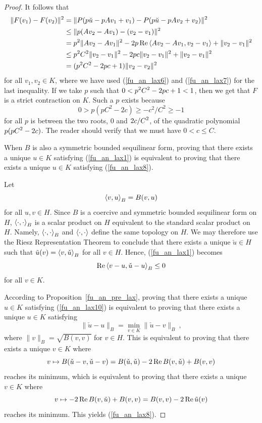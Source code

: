 \begin{proof}
It follows that
\begin{align*}
\| F(v_1) - F(v_2) \|^2 &= \| P(p\breve{u}-p Av_1 +v_1) -
P(p\breve{u}-p Av_2 +v_2) \|^2 \\
& \leq \| p (Av_2 - Av_1) - (v_2 - v_1) \|^2 \\
&= p^2 \| Av_2 - Av_1\|^2 -2p \operatorname{Re}\left\langle{Av_2 - Av_1} , {v_2 - v_1}\right\rangle
+ \|v_2 - v_1\|^2 \\
&\leq p^2 C^2 \| v_2-v_1 \|^2 - 2pc \|v_2-v_1\|^2 + \|v_2-v_1\|^2 \\
& = (p^2 C^2 - 2pc +1 ) \|v_2-v_2\|^2
\end{align*}
for all $v_1, v_2 \in K$, where we have used
(\ref{fu_an_lax6}) and (\ref{fu_an_lax7}) for the last
inequality.  If we take $p$ such that
$\displaystyle 0< p^2 C^2 - 2pc +1 <1$, then we
get that $F$ is a strict contraction on $K$.  Such a $p$ exists
because
\[
0 > p(pC^2 -2c) \geq -c^2/C^2 \geq -1
\]
for all $p$ is between the two roots, $0$ and $\displaystyle 2c/C^2$, of the
quadratic polynomial $\displaystyle p(pC^2 -2c)$.  The reader should verify
that we must have $0<c\leq C$.

 When $B$ is also a symmetric bounded sequilinear form,
proving that there exists a unique $u\in K$ satisfying
(\ref{fu_an_lax1}) is equivalent to proving that there exists a unique
$u\in K$ satisfying (\ref{fu_an_lax8}).

Let
\[
\left\langle{v} , {u}\right\rangle_B = B(v,u) 
\]
for all $u,v \in H$.  Since $B$ is a coercive and symmetric bounded
sequilinear form on $H$, $\left\langle{\cdot} , {\cdot}\right\rangle_B$ is a scalar product on
$H$ equivalent to the standard scalar product on $H$.  Namely,
$\left\langle{\cdot} , {\cdot}\right\rangle_B$ and $\left\langle{\cdot} , {\cdot}\right\rangle$ define the same topology
on $H$.
We may therefore use the Riesz Representation Theorem to conclude
that there exists a unique $\check{u} \in H$ such that
$\displaystyle \tilde{u}(v) = \left\langle{v} , {\check{u}}\right\rangle_B$ for all $v \in H$.
Hence, (\ref{fu_an_lax1}) becomes
\begin{equation} \label{fu_an_lax10}
\operatorname{Re} \left\langle{v-u} , {\check{u}-u}\right\rangle_B \leq 0
\end{equation}
for all $v \in K$.

According to Proposition~\ref{fu_an_pre_lax}, proving that there exists
a unique $u\in K$ satisfying (\ref{fu_an_lax10}) is equivalent to
proving that there exists a unique $u\in K$ satisfying
\[
\| \check{u}-u\|_B = \min_{v\in K} \|\check{u}-v\|_B \ ,
\]
where $\|v\|_B = \sqrt{B(v,v)}$ for $v \in H$.  This is equivalent to
proving that there exists a unique $v \in K$ where
\[
v \mapsto B(\check{u}-v,\check{u}-v) = B(\check{u},\check{u})
-2 \operatorname{Re} B(v,\check{u}) + B(v,v)
\]
reaches its minimum, which is equivalent to proving that there exists
a unique $v \in K$ where
\[
v \mapsto  -2 \operatorname{Re} B(v,\check{u}) + B(v,v) = B(v,v) - 2 \operatorname{Re} \tilde{u}(v)
\]
reaches its minimum.  This yields (\ref{fu_an_lax8}).
\end{proof}

